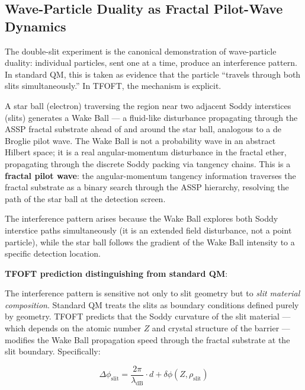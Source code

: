 
\subsection{Wave-Particle Duality as Fractal Pilot-Wave Dynamics}

  The double-slit experiment is the canonical demonstration of wave-particle duality:
  individual particles, sent one at a time, produce an interference pattern. In
  standard QM, this is taken as evidence that the particle ``travels through both
  slits simultaneously.'' In TFOFT, the mechanism is explicit.

  A star ball (electron) traversing the region near two adjacent Soddy interstices
  (slits) generates a Wake Ball --- a fluid-like disturbance propagating through
  the ASSP fractal substrate ahead of and around the star ball, analogous to a
  de Broglie pilot wave. The Wake Ball is not a probability wave in an abstract
  Hilbert space; it is a real angular-momentum disturbance in the fractal ether,
  propagating through the discrete Soddy packing via tangency chains. This is
  a \textbf{fractal pilot wave}: the angular-momentum tangency information traverses
  the fractal substrate as a binary search through the ASSP hierarchy, resolving
  the path of the star ball at the detection screen.

  The interference pattern arises because the Wake Ball explores both Soddy
  interstice paths simultaneously (it is an extended field disturbance, not a
  point particle), while the star ball follows the gradient of the Wake Ball
  intensity to a specific detection location.

  \textbf{TFOFT prediction distinguishing from standard QM}:

  The interference pattern is sensitive not only to slit geometry but to
  \emph{slit material composition}. Standard QM treats the slits as boundary
  conditions defined purely by geometry. TFOFT predicts that the Soddy curvature
  of the slit material --- which depends on the atomic number $Z$ and crystal
  structure of the barrier --- modifies the Wake Ball propagation speed through
  the fractal substrate at the slit boundary. Specifically:

  \begin{equation}
    \Delta\phi_{\text{slit}} = \frac{2\pi}{\lambda_{\text{dB}}} \cdot d
      + \delta\phi(Z, \rho_{\text{slit}})
    \label{eq:slit_material}
  \end{equation}

